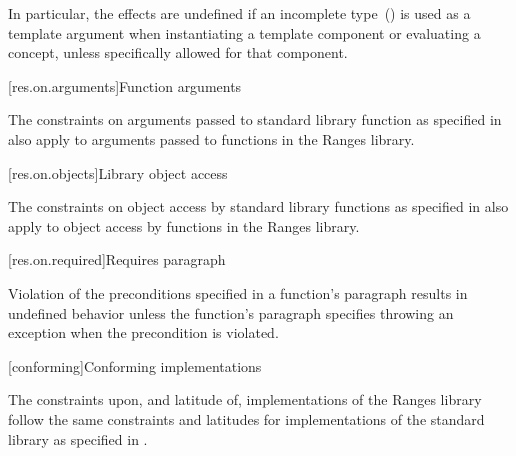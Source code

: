 \pnum
In particular, the effects are undefined if an incomplete
type~() is used as a template argument when instantiating a
template component or evaluating a concept, unless specifically allowed for that
component.

[res.on.arguments]{Function arguments}

\pnum
{}%
%
The constraints on arguments passed to \Cpp standard library function as
specified in  also apply to arguments passed to
functions in the Ranges library.

[res.on.objects]{Library object access}

\pnum
The constraints on object access by \Cpp standard library functions as specified
in  also apply to object access by functions in the
Ranges library.

[res.on.required]{Requires paragraph}

\pnum
{}%
Violation of the preconditions specified in a function's \requires paragraph
results in undefined behavior unless the function's \throws paragraph specifies
throwing an exception when the precondition is violated.

[conforming]{Conforming implementations}

\pnum
The constraints upon, and latitude of, implementations of the Ranges library
follow the same constraints and latitudes for implementations of the \Cpp
standard library as specified in .
